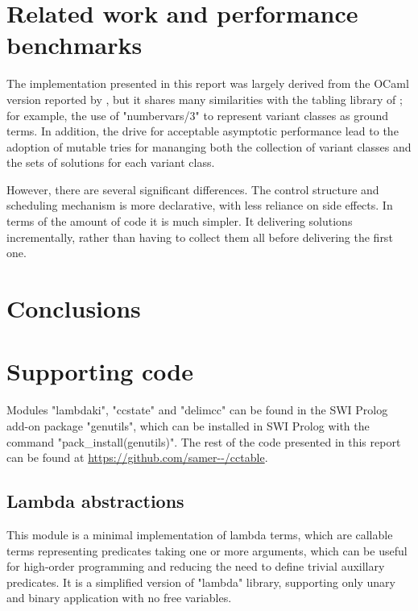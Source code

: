 \section{Related work and performance benchmarks}

The implementation presented in this report was largely derived from the OCaml
version reported by \cite{Abdallah2017a}, but it shares many similarities with
the tabling library of \cite{DesouterVan-DoorenSchrijvers2015}; for example,
the use of "numbervars/3" to represent variant classes as ground terms. In
addition, the drive for acceptable asymptotic performance lead to the adoption
of mutable tries for mananging both the collection of variant classes and the sets
of solutions for each variant class.

However, there are several significant differences.
The control structure and scheduling mechanism is more declarative, with less
reliance on side effects. In terms of the amount of code it is much simpler.
It delivering solutions incrementally, rather than having to collect them all before 
delivering the first one.

\section{Conclusions}

\appendix
\section{Supporting code}

Modules "lambdaki", "ccstate" and "delimcc" can be found in the SWI Prolog
add-on package "genutils", which can be installed in SWI Prolog with the command
"pack_install(genutils)". The rest of the code presented in this report can be
found at \url{https://github.com/samer--/cctable}.

\subsection{Lambda abstractions}
\label{sec:lambdaki}

This module is a minimal implementation of lambda terms, which are callable terms representing
predicates taking one or more arguments, which can be useful for high-order programming and
reducing the need to define trivial auxillary predicates. It is a simplified version of 
 "lambda" library,
supporting only unary and binary application with no free variables.


